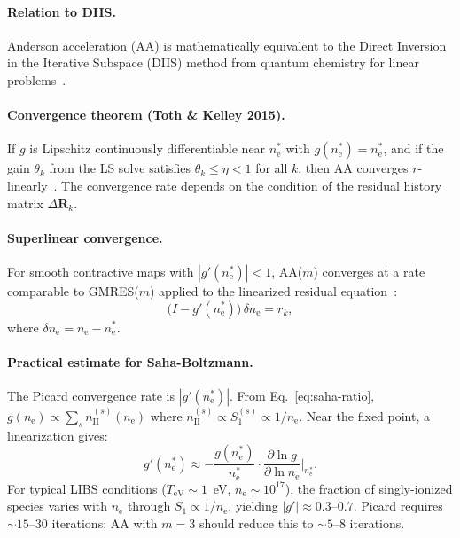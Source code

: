 \documentclass[11pt]{article}
\newcommand{\ne}{n_\mathrm{e}}
\newcommand{\TeV}{T_\mathrm{eV}}
\newcommand{\DR}{\Delta\mathbf{R}}
\begin{document}
\paragraph{Relation to DIIS.}
Anderson acceleration (AA) is mathematically equivalent to the Direct
Inversion in the Iterative Subspace (DIIS) method from quantum
chemistry for linear problems~\cite{rohwedder-schneider-2011}.

\paragraph{Convergence theorem (Toth \& Kelley 2015).}
If $g$ is Lipschitz continuously differentiable near $\ne^*$ with
$g(\ne^*) = \ne^*$, and if the gain $\theta_k$ from the LS solve
satisfies $\theta_k \le \eta < 1$ for all $k$, then AA converges
$r$-linearly~\cite{toth-kelley-2015}.  The convergence rate depends on
the condition of the residual history matrix $\DR_k$.

\paragraph{Superlinear convergence.}
For smooth contractive maps with $|g'(\ne^*)| < 1$, AA($m$) converges
at a rate comparable to GMRES($m$) applied to the linearized residual
equation~\cite{walker-ni-2011}:
%
\begin{equation}
  \label{eq:linearized}
  \bigl(I - g'(\ne^*)\bigr)\,\delta\ne = r_k,
\end{equation}
%
where $\delta\ne = \ne - \ne^*$.

\paragraph{Practical estimate for Saha-Boltzmann.}
The Picard convergence rate is $|g'(\ne^*)|$.  From Eq.~\eqref{eq:saha-ratio},
$g(\ne) \propto \sum_s n_\mathrm{II}^{(s)}(\ne)$ where
$n_\mathrm{II}^{(s)} \propto S_1^{(s)} \propto 1/\ne$.  Near the fixed
point, a linearization gives:
%
\begin{equation}
  \label{eq:contraction-rate}
  g'(\ne^*) \approx -\frac{g(\ne^*)}{\ne^*} \cdot
  \frac{\partial \ln g}{\partial \ln \ne}\biggr|_{\ne^*}.
\end{equation}
%
For typical LIBS conditions ($\TeV \sim 1$~eV, $\ne \sim 10^{17}$),
the fraction of singly-ionized species varies with $\ne$ through
$S_1 \propto 1/\ne$, yielding $|g'| \approx 0.3$--$0.7$.
Picard requires $\sim 15$--$30$ iterations; AA with $m = 3$ should
reduce this to $\sim 5$--$8$ iterations.
\end{document}
